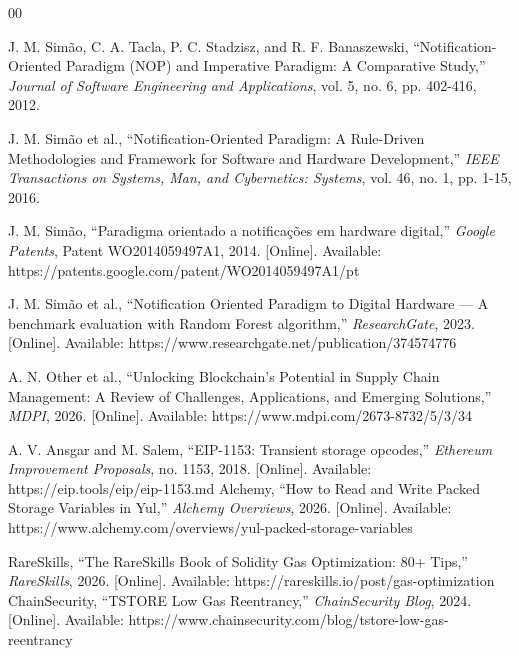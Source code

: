 \documentclass[conference]{IEEEtran}
\begin{document}
\begin{thebibliography}{00}

J. M. Simão, C. A. Tacla, P. C. Stadzisz, and R. F. Banaszewski, ``Notification-Oriented Paradigm (NOP) and Imperative Paradigm: A Comparative Study,'' \textit{Journal of Software Engineering and Applications}, vol. 5, no. 6, pp. 402-416, 2012.

J. M. Simão et al., ``Notification-Oriented Paradigm: A Rule-Driven Methodologies and Framework for Software and Hardware Development,'' \textit{IEEE Transactions on Systems, Man, and Cybernetics: Systems}, vol. 46, no. 1, pp. 1-15, 2016.

J. M. Simão, ``Paradigma orientado a notificações em hardware digital,'' \textit{Google Patents}, Patent WO2014059497A1, 2014. [Online]. Available: https://patents.google.com/patent/WO2014059497A1/pt

J. M. Simão et al., ``Notification Oriented Paradigm to Digital Hardware — A benchmark evaluation with Random Forest algorithm,'' \textit{ResearchGate}, 2023. [Online]. Available: https://www.researchgate.net/publication/374574776

A. N. Other et al., ``Unlocking Blockchain's Potential in Supply Chain Management: A Review of Challenges, Applications, and Emerging Solutions,'' \textit{MDPI}, 2026. [Online]. Available: https://www.mdpi.com/2673-8732/5/3/34



A. V. Ansgar and M. Salem, ``EIP-1153: Transient storage opcodes,'' \textit{Ethereum Improvement Proposals}, no. 1153, 2018. [Online]. Available: https://eip.tools/eip/eip-1153.md
Alchemy, ``How to Read and Write Packed Storage Variables in Yul,'' \textit{Alchemy Overviews}, 2026. [Online]. Available: https://www.alchemy.com/overviews/yul-packed-storage-variables

RareSkills, ``The RareSkills Book of Solidity Gas Optimization: 80+ Tips,'' \textit{RareSkills}, 2026. [Online]. Available: https://rareskills.io/post/gas-optimization
ChainSecurity, ``TSTORE Low Gas Reentrancy,'' \textit{ChainSecurity Blog}, 2024. [Online]. Available: https://www.chainsecurity.com/blog/tstore-low-gas-reentrancy


\end{thebibliography}
\end{document}
